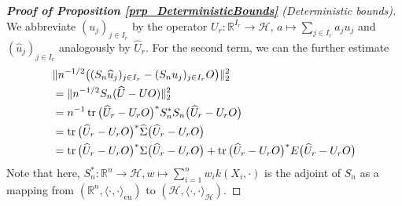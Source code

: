 \documentclass[a4paper,11pt]{article} %
\numberwithin{equation}{section}
\DeclareMathOperator*{\tr}{tr}
\theoremstyle{definition}
\theoremstyle{remark}
\theoremstyle{plain}
\begin{document}
\begin{proof}[\normalfont \textbf{Proof of Proposition \ref{prp_DeterministicBounds}} (Deterministic bounds)]
  We abbreviate \( (u_{j})_{j \in I_{r}} \) by the operator $U_r: \mathbb{R}^{I_{r}} \to \mathcal{H} $, \( a \mapsto \sum_{j \in I_r} a_{j} u_{j} \) and \( (\widehat{u}_{j})_{j \in I_{r}} \) analogously by $ \widehat U_r $. 
  For the second term, we can the further estimate
  \begin{align}
    & 
    \| n^{-1/2} \big( (S_{n} \widehat{u}_j)_{j \in I_{r}} - (S_{n} u_{j})_{j \in I_{r}} O \big) \|_{2}^2
    \\
    &= 
    \| n^{-1/2} S_{n} (\widehat{U} - U O) \|_{2}^2
    \notag
    \\
    & = 
    n^{-1} \tr \big( \widehat U_r - U_r O \big)^{*} S_{n}^{*} S_{n} \big( \widehat U_r - U_r O \big)
    \notag
    \\
    &= 
           \tr \big( \widehat U_r - U_r O \big)^{*} \widehat{\Sigma} \big( \widehat U_r - U_r O \big)
    \notag
    \\
    & = 
           \tr \big( \widehat U_r - U_r O \big)^{*} \Sigma \big( \widehat U_r - U_r O \big)
    +
           \tr \big( \widehat U_r - U_r O \big)^{*} E \big( \widehat U_r - U_r O \big)
    \notag
    \end{align}
    Note that here, \( S_{n}^{*}: \mathbb{R}^{n}\rightarrow \mathcal{H},  w \mapsto \sum_{i = 1}^{n} w_{i} k(X_{i}, \cdot) \) is the adjoint of \( S_{n} \) as a mapping from \( (\mathbb{R}^{n}, \langle \cdot, \cdot \rangle_{\text{eu}}) \) to \( (\mathcal{H}, \langle \cdot, \cdot \rangle_{\mathcal{H}}) \).


\end{proof}
\end{document}
